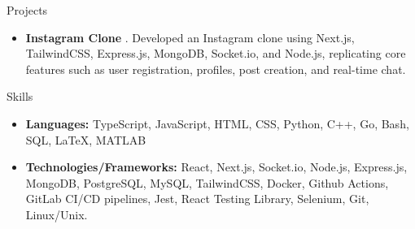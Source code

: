 \documentclass[]{mcdowellcv}
\begin{document}
	
	\begin{cvsection}{Projects}
		\begin{cvsubsection}{}{}{}
			\begin{itemize}
				\item \textbf{Instagram Clone} \href{https://github.com/pl3lee/instagram-clone}{\faGithub}. Developed an Instagram clone using Next.js, TailwindCSS, Express.js, MongoDB, Socket.io, and Node.js, replicating core features such as user registration, profiles, post creation, and real-time chat.
			\end{itemize}
		\end{cvsubsection}
	\end{cvsection}

	\begin{cvsection}{Skills}
		\begin{cvsubsection}{}{}{}	
			\begin{itemize}
				\item \textbf{Languages:} TypeScript, JavaScript, HTML, CSS, Python, C++, Go, Bash, SQL, LaTeX, MATLAB
				\item \textbf{Technologies/Frameworks:} React, Next.js, Socket.io, Node.js, Express.js, MongoDB, PostgreSQL, MySQL, TailwindCSS, Docker, Github Actions, GitLab CI/CD pipelines, Jest, React Testing Library, Selenium, Git, Linux/Unix.
			\end{itemize}
		\end{cvsubsection}
	\end{cvsection}
	
\end{document}
